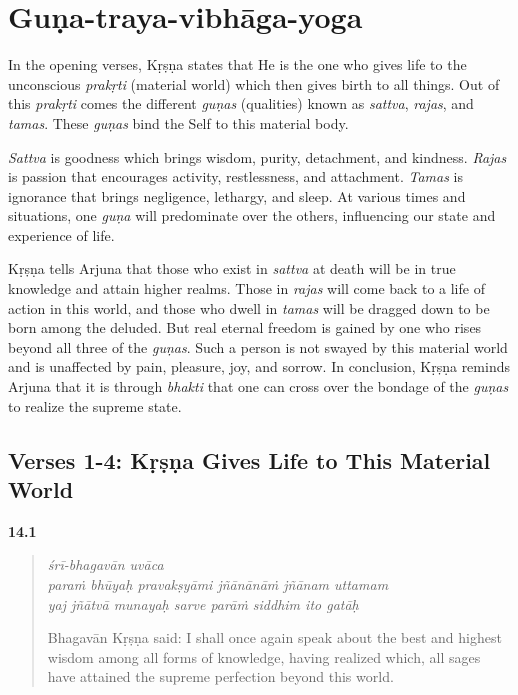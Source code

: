 \chapter{Guṇa-traya-vibhāga-yoga}\label{chap-guna-traya-vibhaga-yoga}

\noindent In the opening verses, Kṛṣṇa states that He is the one who gives life to the unconscious \textit{prakṛti} (material world) which then gives birth to all things. Out of this \textit{prakṛti} comes the different \textit{guṇas} (qualities) known as \textit{sattva}, \textit{rajas}, and \textit{tamas}. These \textit{guṇas} bind the Self to this material body.

\textit{Sattva} is goodness which brings wisdom, purity, detachment, and kindness. \textit{Rajas} is passion that encourages activity, restlessness, and attachment. \textit{Tamas} is ignorance that brings negligence, lethargy, and sleep. At various times and situations, one \textit{guṇa} will predominate over the others, influencing our state and experience of life.

Kṛṣṇa tells Arjuna that those who exist in \textit{sattva} at death will be in true knowledge and attain higher realms. Those in \textit{rajas} will come back to a life of action in this world, and those who dwell in \textit{tamas} will be dragged down to be born among the deluded. But real eternal freedom is gained by one who rises beyond all three of the \textit{guṇas}. Such a person is not swayed by this material world and is unaffected by pain, pleasure, joy, and sorrow. In conclusion, Kṛṣṇa reminds Arjuna that it is through \textit{bhakti} that one can cross over the bondage of the \textit{guṇas} to realize the supreme state.

\section{Verses 1-4: Kṛṣṇa Gives Life to This Material World}\label{sec-verses-1-4-krsna-gives-life-to-this-material-world}



\par\noindent\textbf{14.1}\par
\begin{verse}
\textit{śrī-bhagavān uvāca} \\
\textit{paraṁ bhūyaḥ pravakṣyāmi jñānānāṁ jñānam uttamam} \\
\textit{yaj jñātvā munayaḥ sarve parāṁ siddhim ito gatāḥ}

\noindent Bhagavān Kṛṣṇa said: I shall once again speak about the best and highest wisdom among all forms of knowledge, having realized which, all sages have attained the supreme perfection beyond this world.
\end{verse}
\par



